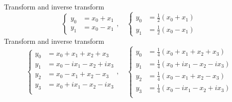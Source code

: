 \documentclass[12pt]{article}
\begin{document}
Transform and inverse transform
$$
\begin{cases}
y_0&=x_0+x_1\\
y_1&=x_0-x_1
\end{cases},\quad
\begin{cases}
y_0&=\frac{1}{2}(x_0+x_1)\\
y_1&=\frac{1}{2}(x_0-x_1)
\end{cases}
$$
Transform and inverse transform
$$
\begin{cases}
y_0&=x_0+x_1+x_2+x_3\\
y_1&=x_0-ix_1-x_2+ix_3\\
y_2&=x_0-x_1+x_2-x_3\\
y_3&=x_0+ix_1-x_2-ix_3\\
\end{cases},\quad
\begin{cases}
y_0&=\frac{1}{4}(x_0+x_1+x_2+x_3)\\
y_1&=\frac{1}{4}(x_0+ix_1-x_2-ix_3)\\
y_2&=\frac{1}{4}(x_0-x_1+x_2-x_3)\\
y_3&=\frac{1}{4}(x_0-ix_1-x_2+ix_3)\\
\end{cases}
$$
\end{document}
